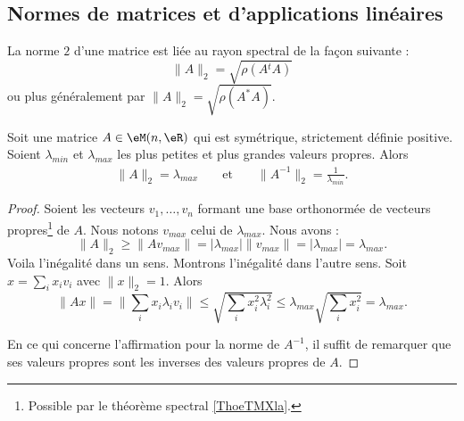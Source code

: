\subsection{Normes de matrices et d'applications linéaires}
\label{subsecNomrApplLin}

\begin{theorem}       \label{THOooNDQSooOUWQrK}
    La norme $2$ d'une matrice est liée au rayon spectral de la façon suivante :
    \begin{equation}
        \|A\|_2=\sqrt{\rho(A{^t}A)}
    \end{equation}
    ou plus généralement par \( \| A \|_2=\sqrt{\rho(A^*A)}\).
\end{theorem}

\begin{lemma}       \label{LEMooNESTooVvUEOv}
    Soit une matrice \( A\in \eM(n,\eR)\) qui est symétrique, strictement définie positive. Soient \( \lambda_{min}\) et \( \lambda_{max}\) les plus petites et plus grandes valeurs propres. Alors 
    \begin{subequations}
        \begin{align}
            \| A \|_2=\lambda_{max}&&\text{ et }&&\|A^{-1}  \|_2=\frac{1}{ \lambda_{min} }.
        \end{align}
    \end{subequations}
\end{lemma}

\begin{proof}
    Soient les vecteurs \( v_1,\ldots, v_n\) formant une base orthonormée de vecteurs propres\footnote{Possible par le théorème spectral \ref{ThoeTMXla}.} de \( A\). Nous notons \( v_{max}\) celui de \( \lambda_{max}\). Nous avons :
    \begin{equation}
        \| A \|_2\geq \| Av_{max} \|=| \lambda_{max} |\| v_{max} \|=| \lambda_{max} |=\lambda_{max}.
    \end{equation}
    Voila l'inégalité dans un sens. Montrons l'inégalité dans l'autre sens. Soit \( x=\sum_ix_iv_i\) avec \( \| x \|_2=1\). Alors
    \begin{equation}
        \| Ax \|=\| \sum_ix_i\lambda_iv_i \|\leq\sqrt{ \sum_ix_i^2\lambda_i^2 }\leq \lambda_{max}\sqrt{ \sum_ix_i^2}=\lambda_{max}.
    \end{equation}
    
    En ce qui concerne l'affirmation pour la norme de \( A^{-1}\), il suffit de remarquer que ses valeurs propres sont les inverses des valeurs propres de \( A\).
\end{proof}

